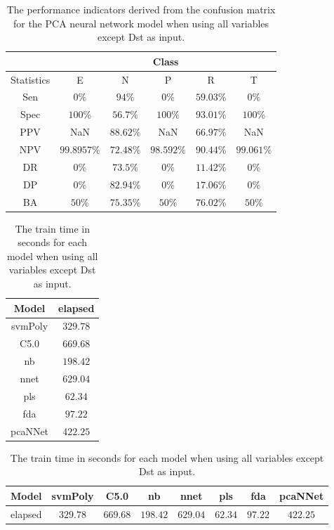 \begin{table}[!ht]
	\centering
	\begin{tabular}{|c|c|c|c|c|c|}
		\hline
		 & \multicolumn{5}{c|}{Class} \\ \hline
		Statistics & E & N & P & R & T \\ \hline
		Sen & $0\%$ & $94\%$ & $0\%$ & $59.03\%$ & $0\%$ \\ \hline
		Spec & $100\%$ & $56.7\%$ & $100\%$ & $93.01\%$ & $100\%$ \\ \hline
		PPV & NaN & $88.62\%$ & NaN & $66.97\%$ & NaN \\ \hline
		NPV & $99.8957\%$ & $72.48\%$ & $98.592\%$ & $90.44\%$ & $99.061\%$ \\ \hline
		DR & $0\%$ & $73.5\%$ & $0\%$ & $11.42\%$ & $0\%$ \\ \hline
		DP & $0\%$ & $82.94\%$ & $0\%$ & $17.06\%$ & $0\%$ \\ \hline
		BA & $50\%$ & $75.35\%$ & $50\%$ & $76.02\%$ & $50\%$ \\ \hline
	\end{tabular}
	\caption{The performance indicators derived from the confusion matrix for the PCA neural network model when using all variables except Dst as input.}
	\label{tab:cs:reverse:noDst:pcaNNet}
\end{table}

\begin{table}[!ht]
	\centering
	\begin{tabular}{|c|c|}
		\hline
		Model & elapsed \\ \hline
		svmPoly & $329.78$ \\ \hline
		C5.0 & $669.68$ \\ \hline
		nb & $198.42$ \\ \hline
		nnet & $629.04$ \\ \hline
		pls & $62.34$ \\ \hline
		fda & $97.22$ \\ \hline
		pcaNNet & $422.25$ \\ \hline
	\end{tabular}
	\caption{The train time in seconds for each model when using all variables except Dst as input.}
	\label{tab:time:noDst:train}
\end{table}

\begin{table}[!ht]
	\centering
	\begin{tabular}{|c|c|c|c|c|c|c|c|}
		\hline
		Model & svmPoly & C5.0 & nb & nnet & pls & fda & pcaNNet \\ \hline
		elapsed & $329.78$ & $669.68$ & $198.42$ & $629.04$ & $62.34$ & $97.22$ & $422.25$ \\ \hline
	\end{tabular}
	\caption{The train time in seconds for each model when using all variables except Dst as input.}
	\label{tab:time:reverse:noDst:train}
\end{table}

